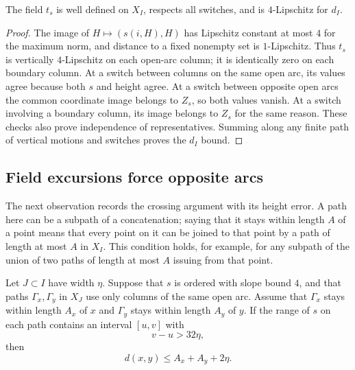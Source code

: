 \begin{lemma}\label{ord:transverse-lipschitz}
The field $t_s$ is well defined on $X_I$, respects all switches,
and is $4$-Lipschitz for $d_I$.
\end{lemma}

\begin{proof}
The image of $H\mapsto(s(i,H),H)$ has Lipschitz constant at most
$4$ for the maximum norm, and distance to a fixed nonempty set
is $1$-Lipschitz. Thus $t_s$ is vertically $4$-Lipschitz on
each open-arc column; it is identically zero on each boundary
column. At a switch between columns on the same open arc, its
values agree because both $s$ and height agree. At a switch
between opposite open arcs the common coordinate image belongs
to $Z_s$, so both values vanish. At a switch involving a boundary
column, its image belongs to $Z_s$ for the same reason. These
checks also prove independence of representatives. Summing along
any finite path of vertical motions and switches proves the
$d_I$ bound.
\end{proof}

\subsection{Field excursions force opposite arcs}

The next observation records the crossing argument with its height
error. A path here can be a subpath of a concatenation; saying
that it stays within length $A$ of a point means that every point
on it can be joined to that point by a path of length at most $A$
in $X_I$. This condition holds, for example, for any
subpath of the union of two paths of length at most $A$ issuing
from that point.

\begin{lemma}\label{ord:overlap}
Let $J\subset I$ have width $\eta$. Suppose that $s$ is ordered
with slope bound $4$, and that paths $\Gamma_x,\Gamma_y$ in
$X_J$ use only columns of the same open arc. Assume that
$\Gamma_x$ stays within length $A_x$ of $x$ and $\Gamma_y$
stays within length $A_y$ of $y$. If the range of $s$ on each
path contains an interval $[u,v]$ with
\[
 v-u>32\eta,
\]
then
\[
 d(x,y)\le A_x+A_y+2\eta.
\]
\end{lemma}

